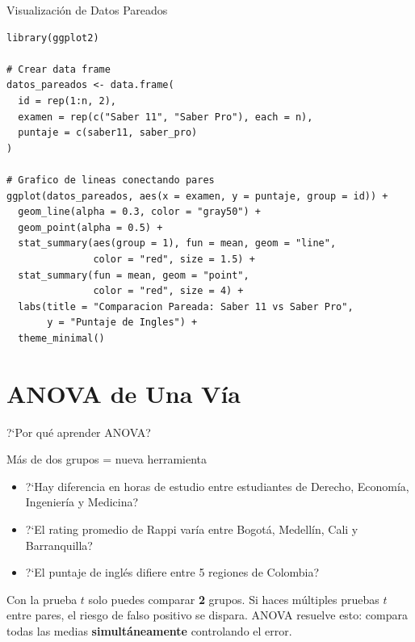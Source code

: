 \documentclass[aspectratio=169, 11pt]{beamer}
\begin{document}
\begin{frame}[fragile]{Visualización de Datos Pareados}
\begin{lstlisting}[basicstyle=\ttfamily\scriptsize]
library(ggplot2)

# Crear data frame
datos_pareados <- data.frame(
  id = rep(1:n, 2),
  examen = rep(c("Saber 11", "Saber Pro"), each = n),
  puntaje = c(saber11, saber_pro)
)

# Grafico de lineas conectando pares
ggplot(datos_pareados, aes(x = examen, y = puntaje, group = id)) +
  geom_line(alpha = 0.3, color = "gray50") +
  geom_point(alpha = 0.5) +
  stat_summary(aes(group = 1), fun = mean, geom = "line",
               color = "red", size = 1.5) +
  stat_summary(fun = mean, geom = "point",
               color = "red", size = 4) +
  labs(title = "Comparacion Pareada: Saber 11 vs Saber Pro",
       y = "Puntaje de Ingles") +
  theme_minimal()
\end{lstlisting}
\end{frame}

\section{ANOVA de Una Vía}

\begin{frame}{?`Por qu\'e aprender ANOVA?}
\small
\begin{exampleblock}{M\'as de dos grupos = nueva herramienta}
\begin{itemize}\setlength{\itemsep}{2pt}
  \item ?`Hay diferencia en horas de estudio entre estudiantes de Derecho, Econom\'ia, Ingenier\'ia y Medicina?
  \item ?`El rating promedio de Rappi var\'ia entre Bogot\'a, Medell\'in, Cali y Barranquilla?
  \item ?`El puntaje de ingl\'es difiere entre 5 regiones de Colombia?
\end{itemize}
\end{exampleblock}

\vspace{0.2cm}
Con la prueba $t$ solo puedes comparar \textbf{2} grupos. Si haces m\'ultiples pruebas $t$ entre pares, el riesgo de falso positivo se \alert{dispara}. ANOVA resuelve esto: compara todas las medias \textbf{simult\'aneamente} controlando el error.
\end{frame}
\end{document}
